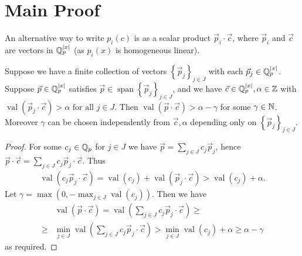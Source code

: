 \documentclass{amsart}
\newcommand{\curly}[1]{\left\{#1\right\}}
\newcommand{\paren}[1]{\left(#1\right)}
\DeclareMathOperator{\vecspan}{span}
\DeclareMathOperator{\val}{val}
\begin{document}

\section{Main Proof}


An alternative way to write $p_i(c)$ is as a scalar product $\vec p_i \cdot \vec c$,
where $\vec p_i$ and $\vec c$ are vectors in $\mathbb{Q}_p^{|x|}$ (as $p_i(x)$ is homogeneous linear).

\begin{Lemma}	 
  Suppose we have a finite collection of vectors $\curly{\vec p_j}_{j \in J}$ with each $\vec p_j \in \mathbb{Q}_p^{|x|}$.
  Suppose $\vec p \in \mathbb{Q}_p^{|x|}$ satisfies $\vec p \in \vecspan \curly{\vec p_j}_{j \in J}$,
  and we have $\vec c \in \mathbb{Q}_p^{|x|}, \alpha \in \mathbb{Z}$ with $\val(\vec p_j \cdot \vec c) > \alpha \text{ for all } j \in J$.
  Then $\val(\vec p \cdot \vec c) > \alpha - \gamma$ for some $\gamma \in \mathbb{N}$.
  Moreover $\gamma$ can be chosen independently from $\vec c, \alpha$ depending only on $\curly{\vec p_j}_{j \in J}$.
\end{Lemma}

\begin{proof}
  For some $c_j \in \mathbb{Q}_p$ for $j \in J$ we have $\vec p = \sum_{j \in J} c_j \vec p_j$,
  hence $\vec p \cdot \vec c = \sum_{j \in J} c_j \vec p_j \cdot \vec c$.
  Thus
  \begin{align*}
    \val \paren{c_j \vec p_j \cdot \vec c} = \val \paren{c_j} + \val \paren{\vec p_j \cdot \vec c} > \val \paren{c_j} + \alpha.
  \end{align*}
  Let $\gamma = \max(0, -\max_{j \in J} \val \paren{c_j})$.
  Then we have 
  \begin{align*}
    &\val(\vec p \cdot \vec c) =
      \val \paren{\sum_{j \in J} c_j \vec p_j \cdot \vec c} \geq \\
      \geq &\min_{j \in J} \val(\sum_{j \in J} c_j \vec p_j \cdot \vec c) >
      \min_{j \in J} \val(c_j) + \alpha \geq
      \alpha - \gamma
  \end{align*}
  as required.
\end{proof}
\end{document}
